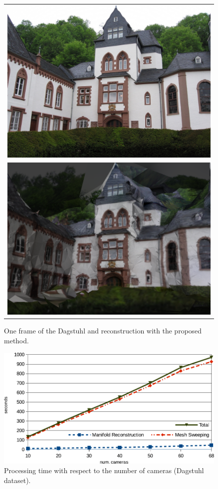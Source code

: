 \begin{figure}[t]
\setlength{\tabcolsep}{1px}
\centering
\begin{tabular}{c}
\includegraphics[width=0.8\columnwidth]{./img/dag004}\\
\includegraphics[width=0.8\columnwidth]{./img/d_crop}\\
\end{tabular}
\caption{One frame of the Dagstuhl and reconstruction with the proposed method.}
\label{fig:Dagstuhl}
\end{figure}

\begin{figure}[t]
\centering
\includegraphics[width=0.99\columnwidth,height=0.19\textwidth]{./img/timing}
\caption{Processing time with respect to the number of cameras (Dagstuhl dataset).}
\label{fig:scalability}
\end{figure}

